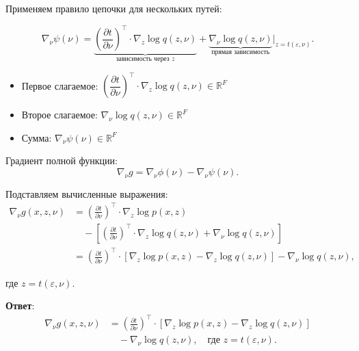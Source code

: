 \documentclass[pract]{SCWorks}
\begin{document}
    Применяем правило цепочки для нескольких путей:

    \[
    \nabla_\nu \psi(\nu) = \underbrace{\left( \frac{\partial t}{\partial \nu} \right)^\top \cdot \nabla_z \log q(z, \nu)}_{\text{зависимость через } z} + \underbrace{\nabla_\nu \log q(z, \nu)}_{\text{прямая зависимость}} \big|_{z = t(\varepsilon, \nu)}.
    \]

    \begin{itemize}
        \item[$\bullet$] Первое слагаемое: $\left(\dfrac{\partial t}{\partial \nu}\right)^\top \cdot \nabla_z \log q(z, \nu) \in \mathbb{R}^F$
        \item[$\bullet$] Второе слагаемое: $\nabla_\nu \log q(z, \nu) \in \mathbb{R}^F$
        \item[$\bullet$] Сумма: $\nabla_\nu \psi(\nu) \in \mathbb{R}^F$
    \end{itemize}

    Градиент полной функции:
    \[
    \nabla_\nu g = \nabla_\nu \phi(\nu) - \nabla_\nu \psi(\nu).
    \]

    Подставляем вычисленные выражения:
    \[
    \begin{aligned}
    \nabla_\nu g(x, z, \nu) &= \left( \frac{\partial t}{\partial \nu} \right)^\top \cdot \nabla_z \log p(x, z) \\
    &\quad - \left[ \left( \frac{\partial t}{\partial \nu} \right)^\top \cdot \nabla_z \log q(z, \nu) + \nabla_\nu \log q(z, \nu) \right] \\
    &= \left( \frac{\partial t}{\partial \nu} \right)^\top \cdot \left[ \nabla_z \log p(x, z) - \nabla_z \log q(z, \nu) \right] - \nabla_\nu \log q(z, \nu),
    \end{aligned}
    \]

    где $z = t(\varepsilon, \nu)$.

    \textbf{Ответ}:
    \[
    \boxed{
    \begin{aligned}
    \nabla_\nu g(x, z, \nu) &= \left( \frac{\partial t}{\partial \nu} \right)^\top \cdot \left[ \nabla_z \log p(x, z) - \nabla_z \log q(z, \nu) \right] \\
    &\quad - \nabla_\nu \log q(z, \nu), \quad \text{где } z = t(\varepsilon, \nu).
    \end{aligned}
    }
    \]























    \newpage



    \appendix
\end{document}
